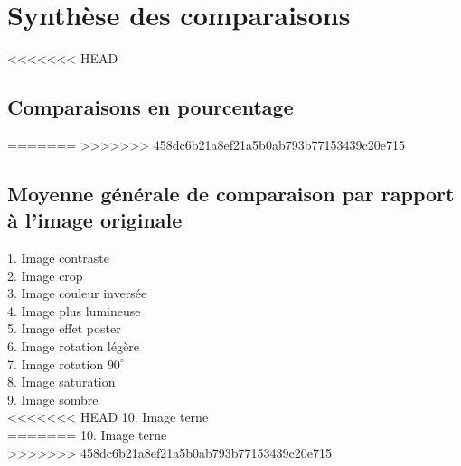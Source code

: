 \section{Synthèse des comparaisons}\label{synthese-des-comparaisons}

<<<<<<< HEAD
\subsection{Comparaisons en pourcentage}
=======
>>>>>>> 458dc6b21a8ef21a5b0ab793b77153439c20e715
\begin{table}[htbp]
\centering
{}
\end{table}

\subsection{Moyenne générale de comparaison par rapport à l'image originale}
\begin{bchart}[step=10,max=50,width=7in]
\centering
            \smallskip
            \smallskip
            \smallskip
            \smallskip
            \smallskip
            \smallskip
            \smallskip
            \smallskip
            \smallskip
\end{bchart}

1.  Image contraste \\
2.  Image crop \\
3.  Image couleur inversée \\
4.  Image plus lumineuse \\
5.  Image effet poster \\
6.  Image rotation légère \\
7.  Image rotation $90^{\circ}$ \\
8.  Image saturation \\
9.  Image sombre \\
<<<<<<< HEAD
10. Image terne \\
=======
10. Image terne \\
>>>>>>> 458dc6b21a8ef21a5b0ab793b77153439c20e715

